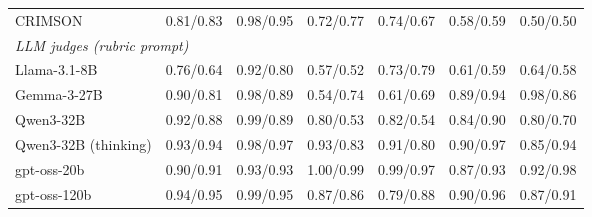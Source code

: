 \begin{tabular}{lcccccc}
CRIMSON & 0.81/0.83 & 0.98/0.95 & 0.72/0.77 & 0.74/0.67 & 0.58/0.59 & 0.50/0.50 \\
\multicolumn{7}{l}{\textit{LLM judges (rubric prompt)}} \\
Llama-3.1-8B & 0.76/0.64 & 0.92/0.80 & 0.57/0.52 & 0.73/0.79 & 0.61/0.59 & 0.64/0.58 \\
Gemma-3-27B & 0.90/0.81 & 0.98/0.89 & 0.54/0.74 & 0.61/0.69 & 0.89/0.94 & 0.98/0.86 \\
Qwen3-32B & 0.92/0.88 & 0.99/0.89 & 0.80/0.53 & 0.82/0.54 & 0.84/0.90 & 0.80/0.70 \\
Qwen3-32B (thinking) & 0.93/0.94 & 0.98/0.97 & 0.93/0.83 & 0.91/0.80 & 0.90/0.97 & 0.85/0.94 \\
gpt-oss-20b & 0.90/0.91 & 0.93/0.93 & 1.00/0.99 & 0.99/0.97 & 0.87/0.93 & 0.92/0.98 \\
gpt-oss-120b & 0.94/0.95 & 0.99/0.95 & 0.87/0.86 & 0.79/0.88 & 0.90/0.96 & 0.87/0.91 \\
\bottomrule
\end{tabular}